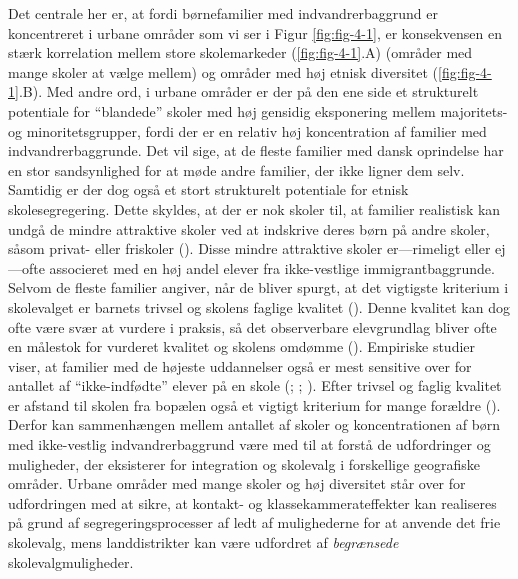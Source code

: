 \documentclass[
]{book}
\begin{document}
Det centrale her er, at fordi børnefamilier med indvandrerbaggrund er koncentreret i urbane områder som vi ser i Figur \ref{fig:fig-4-1}, er konsekvensen en stærk korrelation mellem store skolemarkeder (\ref{fig:fig-4-1}.A) (områder med mange skoler at vælge mellem) og områder med høj etnisk diversitet (\ref{fig:fig-4-1}.B). Med andre ord, i urbane områder er der på den ene side et strukturelt potentiale for ``blandede'' skoler med høj gensidig eksponering mellem majoritets- og minoritetsgrupper, fordi der er en relativ høj koncentration af familier med indvandrerbaggrunde. Det vil sige, at de fleste familier med dansk oprindelse har en stor sandsynlighed for at møde andre familier, der ikke ligner dem selv. Samtidig er der dog også et stort strukturelt potentiale for etnisk skolesegregering. Dette skyldes, at der er nok skoler til, at familier realistisk kan undgå de mindre attraktive skoler ved at indskrive deres børn på andre skoler, såsom privat- eller friskoler (). Disse mindre attraktive skoler er---rimeligt eller ej---ofte associeret med en høj andel elever fra ikke-vestlige immigrantbaggrunde. Selvom de fleste familier angiver, når de bliver spurgt, at det vigtigste kriterium i skolevalget er barnets trivsel og skolens faglige kvalitet (). Denne kvalitet kan dog ofte være svær at vurdere i praksis, så det observerbare elevgrundlag bliver ofte en målestok for vurderet kvalitet og skolens omdømme (). Empiriske studier viser, at familier med de højeste uddannelser også er mest sensitive over for antallet af ``ikke-indfødte'' elever på en skole (; ; ). Efter trivsel og faglig kvalitet er afstand til skolen fra bopælen også et vigtigt kriterium for mange forældre (). Derfor kan sammenhængen mellem antallet af skoler og koncentrationen af børn med ikke-vestlig indvandrerbaggrund være med til at forstå de udfordringer og muligheder, der eksisterer for integration og skolevalg i forskellige geografiske områder. Urbane områder med mange skoler og høj diversitet står over for udfordringen med at sikre, at kontakt- og klassekammerateffekter kan realiseres på grund af segregeringsprocesser af ledt af mulighederne for at anvende det frie skolevalg, mens landdistrikter kan være udfordret af \emph{begrænsede} skolevalgmuligheder.
\end{document}

